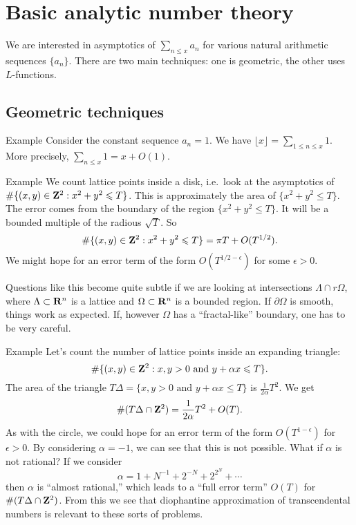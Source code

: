 
\section{Basic analytic number theory}\label{sec:granville-ii}





We are interested in asymptotics of $\sum_{n\leqslant x} a_n$ for various 
natural arithmetic sequences $\{a_n\}$. There are two main techniques: one is 
geometric, the other uses $L$-functions. 





\subsection{Geometric techniques}

\begin{enonce}[remark]{Example}
Consider the constant sequence $a_n=1$. We have 
$\lfloor x\rfloor = \sum_{1\leqslant n \leqslant x} 1$. More precisely, 
$\sum_{n\leqslant x} 1 = x+O(1)$. 
\end{enonce}

\begin{enonce}[remark]{Example}
We count lattice points inside a disk, i.e.~look at the asymptotics of 
$\#\{(x,y)\in \mathbf{Z}^2:x^2+y^2\leqslant T\}$. This is approximately the area of 
$\{x^2+y^2\leqslant T\}$. The error comes from the boundary of the region 
$\{x^2+y^2\leqslant T\}$. It will be a bounded multiple of the radious 
$\sqrt T$. So 
\[
  \#\{(x,y)\in \mathbf{Z}^2:x^2+y^2\leqslant T\} = \pi T + O(T^{1/2}) . 
\]
We might hope for an error term of the form $O(T^{1/2-\epsilon})$ for some 
$\epsilon>0$. 
\end{enonce}

Questions like this become quite subtle if we are looking at intersections 
$\Lambda\cap r\Omega$, where $\Lambda\subset \mathbf{R}^n$ is a lattice and 
$\Omega\subset \mathbf{R}^n$ is a bounded region. If $\partial\Omega$ is smooth, 
things work as expected. If, however $\Omega$ has a ``fractal-like'' boundary, 
one has to be very careful. 

\begin{enonce}[remark]{Example}
Let's count the number of lattice points inside an expanding triangle: 
\[
  \#\{(x,y)\in \mathbf{Z}^2:x,y>0\text{ and }y+\alpha x\leqslant T\} .
\]
The area of the triangle 
$T\Delta = \{x,y>0\text{ and }y+\alpha x\leqslant T\}$ is 
$\frac{1}{2\alpha}T^2$. We get 
\[
  \#(T\Delta\cap \mathbf{Z}^2) = \frac{1}{2\alpha} T^2 + O(T) .
\]
As with the circle, we could hope for an error term of the form 
$O(T^{1-\epsilon})$ for $\epsilon>0$. By considering $\alpha=-1$, we can see 
that this is not possible. What if $\alpha$ is not rational? If we 
consider 
\[
  \alpha = 1+N^{-1} + 2^{-N} + 2^{2^N} + \cdots
\]
then $\alpha$ is ``almost rational,'' which leads to a ``full error term'' 
$O(T)$ for $\# (T\Delta\cap \mathbf{Z}^2)$. From this we see that diophantine 
approximation of transcendental numbers is relevant to these sorts of 
problems. 
\end{enonce}

